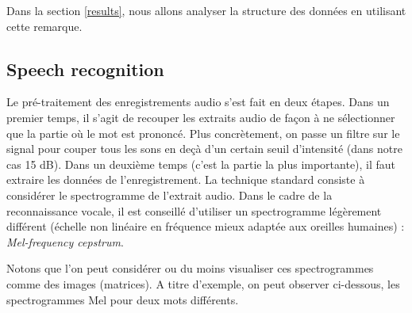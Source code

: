 \documentclass[12 pt, a4paper]{article}
\begin{document}
Dans la section \ref{results}, nous allons analyser la structure des données en utilisant cette remarque.

\subsection{Speech recognition}

Le pré-traitement des enregistrements audio s'est fait en deux étapes. Dans un premier temps, il s'agit de recouper les extraits audio de façon à ne sélectionner que la partie où le mot est prononcé. Plus concrètement, on passe un filtre sur le signal pour couper tous les sons en deçà d'un certain seuil d'intensité (dans notre cas 15 dB). Dans un deuxième temps (c'est la partie la plus importante), il faut extraire les données de l'enregistrement. La technique standard consiste à considérer le spectrogramme de l'extrait audio. Dans le cadre de la reconnaissance vocale, il est conseillé d'utiliser un spectrogramme légèrement différent (échelle non linéaire en fréquence mieux adaptée aux oreilles humaines) : \textit{Mel-frequency cepstrum}.

Notons que l'on peut considérer ou du moins visualiser ces spectrogrammes comme des images (matrices). A titre d'exemple, on peut observer ci-dessous, les spectrogrammes Mel pour deux mots différents.


\end{document}
